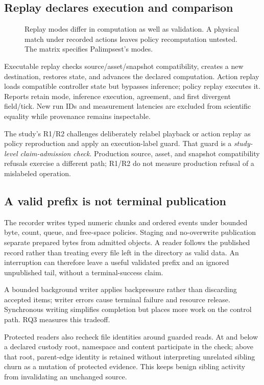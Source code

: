 \documentclass[10pt]{article}
\begin{document}
\subsection{Replay declares execution and comparison}
\begin{figure}[t]
\centering
\caption{Replay modes differ in computation as well as validation. A physical
match under recorded actions leaves policy recomputation untested. The matrix specifies Palimpsest's modes.}
\label{fig:matrix}
\end{figure}
Executable replay checks source/asset/snapshot compatibility, creates a new
destination, restores state, and advances the declared computation. Action replay
loads compatible controller state but bypasses inference; policy replay executes
it. Reports retain mode, inference execution, agreement, and first divergent
field/tick. New run IDs and measurement latencies are excluded from scientific
equality while provenance remains inspectable.

The study's R1/R2 challenges deliberately relabel playback or action replay as
policy reproduction and apply an execution-label guard. That guard is a
\emph{study-level claim-admission check}. Production source, asset, and snapshot compatibility refusals exercise a
different path; R1/R2 do not measure production refusal of a mislabeled operation.

\subsection{A valid prefix is not terminal publication}
The recorder writes typed numeric chunks and ordered events under bounded byte,
count, queue, and free-space policies. Staging and no-overwrite publication
separate prepared bytes from admitted objects. A reader follows the published
record rather than treating every file left in the directory as valid data.
An interruption can therefore leave a useful validated prefix and an ignored
unpublished tail, without a terminal-success claim.

A bounded background writer applies backpressure rather than discarding
accepted items; writer errors cause terminal failure and resource release.
Synchronous writing simplifies completion but places more work on the control
path. RQ3 measures this tradeoff.

Protected readers also recheck file identities around guarded reads. At and
below a declared custody root, namespace and content participate in the check;
above that root, parent-edge identity is retained without interpreting unrelated
sibling churn as a mutation of protected evidence. This keeps benign sibling activity from invalidating an unchanged source.
\end{document}

